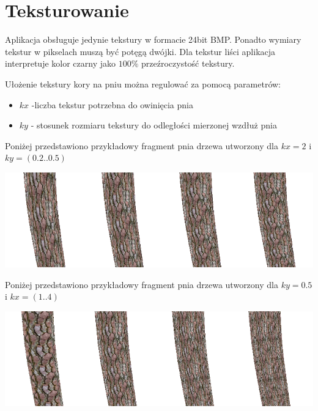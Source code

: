 \section{Teksturowanie}
Aplikacja obsługuje jedynie tekstury w formacie 24bit BMP. 
Ponadto wymiary tekstur w pikselach muszą być potęgą dwójki.
Dla tekstur liści aplikacja interpretuje kolor czarny jako ${100\%}$ przeźroczystość tekstury.

Ułożenie tekstury kory na pniu można regulować za pomocą parametrów:
\begin{itemize}
\item ${kx}$ -liczba tekstur potrzebna do owinięcia pnia
\item ${ky}$ - stosunek rozmiaru tekstury do odległości mierzonej wzdłuż pnia
\end{itemize}
Poniżej przedstawiono przykładowy fragment pnia drzewa utworzony dla ${kx=2}$ i ${ky=(0.2..0.5)}$
\begin{center}
	\includegraphics[width=140mm]{images/textures/ky.png}
	\label{ky_texture}
\end{center}
Poniżej przedstawiono przykładowy fragment pnia drzewa utworzony dla ${ky=0.5}$ i ${kx=(1..4)}$
\begin{center}
	\includegraphics[width=140mm]{images/textures/kx.png}
	\label{kx_texture}
\end{center}

